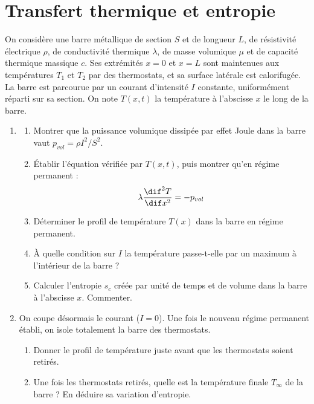 \newpage

\section{Transfert thermique et entropie}

On considère une barre métallique de section $S$ et de longueur $L$, de résistivité électrique $\rho$, de conductivité thermique $\lambda$, de masse volumique $\mu$ et de capacité thermique massique $c$. Ses extrémités $x=0$ et $x=L$ sont maintenues aux températures $T_1$ et $T_2$ par des thermostats, et sa surface latérale est calorifugée. La barre est parcourue par un courant d'intensité $I$ constante, uniformément réparti sur sa section. On note $T(x,t)$ la température à l'abscisse $x$ le long de la barre.

\begin{enumerate}

\item

\begin{enumerate}

	\item Montrer que la puissance volumique dissipée par effet Joule dans la barre vaut $p_{vol}=\rho I^2/S^2$.

	\item Établir l'équation vérifiée par $T(x,t)$, puis montrer qu'en régime permanent :
	\begin{align*}
		\lambda\frac{\dif^2 T}{\dif x^2} = - p_{vol}
	\end{align*}

	\item Déterminer le profil de température $T(x)$ dans la barre en régime permanent.

	\item À quelle condition sur $I$ la température passe-t-elle par un maximum à l'intérieur de la barre ?

	\item Calculer l'entropie $s_c$ créée par unité de temps et de volume dans la barre à l'abscisse $x$. Commenter.

\end{enumerate}

\item On coupe désormais le courant ($I=0$). Une fois le nouveau régime permanent établi, on isole totalement la barre des thermostats.

\begin{enumerate}

	\item Donner le profil de température juste avant que les thermostats soient retirés.

	\item Une fois les thermostats retirés, quelle est la température finale $T_\infty$ de la barre ? En déduire sa variation d'entropie.

\end{enumerate}

\end{enumerate}


